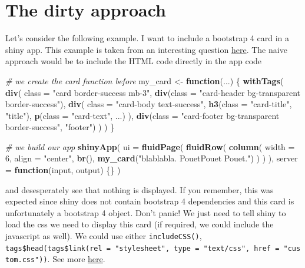 \documentclass[]{book}
\newenvironment{Shaded}{\begin{snugshade}}{\end{snugshade}}
\newcommand{\CommentTok}[1]{\textcolor[rgb]{0.56,0.35,0.01}{\textit{#1}}}
\newcommand{\ControlFlowTok}[1]{\textcolor[rgb]{0.13,0.29,0.53}{\textbf{#1}}}
\newcommand{\DataTypeTok}[1]{\textcolor[rgb]{0.13,0.29,0.53}{#1}}
\newcommand{\DecValTok}[1]{\textcolor[rgb]{0.00,0.00,0.81}{#1}}
\newcommand{\KeywordTok}[1]{\textcolor[rgb]{0.13,0.29,0.53}{\textbf{#1}}}
\newcommand{\NormalTok}[1]{#1}
\newcommand{\StringTok}[1]{\textcolor[rgb]{0.31,0.60,0.02}{#1}}
\begin{document}
\hypertarget{the-dirty-approach}{%
\section{The dirty approach}\label{the-dirty-approach}}

Let's consider the following example. I want to include a bootstrap 4 card in a shiny app.
This example is taken from an interesting question \href{https://community.rstudio.com/t/create-a-div-using-htmltools-withtags/22439/2}{here}.
The naive approach would be to include the HTML code directly in the app code

\begin{Shaded}
\begin{Highlighting}[]
\CommentTok{# we create the card function before}
\NormalTok{my_card <-}\StringTok{ }\ControlFlowTok{function}\NormalTok{(...) \{}
  \KeywordTok{withTags}\NormalTok{(}
    \KeywordTok{div}\NormalTok{(}
      \DataTypeTok{class =} \StringTok{"card border-success mb-3"}\NormalTok{,}
      \KeywordTok{div}\NormalTok{(}\DataTypeTok{class =} \StringTok{"card-header bg-transparent border-success"}\NormalTok{),}
      \KeywordTok{div}\NormalTok{(}
        \DataTypeTok{class =} \StringTok{"card-body text-success"}\NormalTok{,}
        \KeywordTok{h3}\NormalTok{(}\DataTypeTok{class =} \StringTok{"card-title"}\NormalTok{, }\StringTok{"title"}\NormalTok{),}
        \KeywordTok{p}\NormalTok{(}\DataTypeTok{class =} \StringTok{"card-text"}\NormalTok{, ...)}
\NormalTok{      ),}
      \KeywordTok{div}\NormalTok{(}\DataTypeTok{class =} \StringTok{"card-footer bg-transparent border-success"}\NormalTok{, }\StringTok{"footer"}\NormalTok{)}
\NormalTok{    )}
\NormalTok{  )}
\NormalTok{\}}

\CommentTok{# we build our app}
\KeywordTok{shinyApp}\NormalTok{(}
  \DataTypeTok{ui =} \KeywordTok{fluidPage}\NormalTok{(}
    \KeywordTok{fluidRow}\NormalTok{(}
      \KeywordTok{column}\NormalTok{(}
        \DataTypeTok{width =} \DecValTok{6}\NormalTok{,}
        \DataTypeTok{align =} \StringTok{"center"}\NormalTok{,}
        \KeywordTok{br}\NormalTok{(),}
        \KeywordTok{my_card}\NormalTok{(}\StringTok{"blablabla. PouetPouet Pouet."}\NormalTok{)}
\NormalTok{      )}
\NormalTok{    )}
\NormalTok{  ),}
  \DataTypeTok{server =} \ControlFlowTok{function}\NormalTok{(input, output) \{\}}
\NormalTok{)}
\end{Highlighting}
\end{Shaded}

and desesperately see that nothing is displayed. If you remember, this was expected since
shiny does not contain bootstrap 4 dependencies and this card is unfortunately a
bootstrap 4 object. Don't panic! We just need to tell shiny to load the css we need to display
this card (if required, we could include the javascript as well). We could use either
\texttt{includeCSS()}, \texttt{tags\$head(tags\$link(rel\ =\ "stylesheet",\ type\ =\ "text/css",\ href\ =\ "custom.css"))}. See
more \href{https://shiny.rstudio.com/articles/css.html}{here}.
\end{document}
